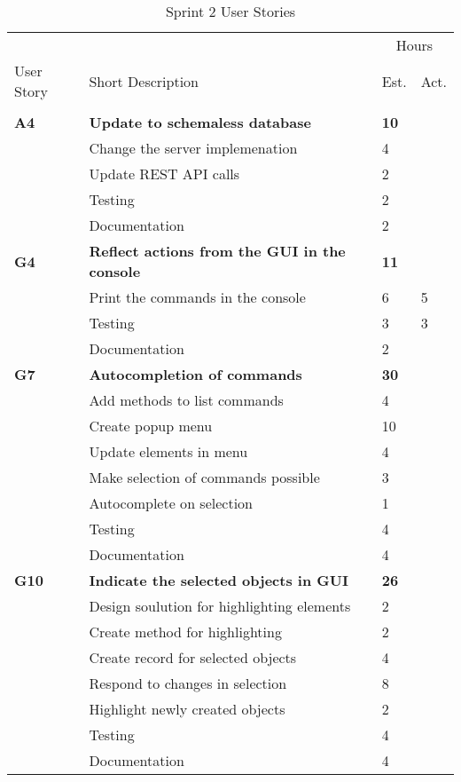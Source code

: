 \begin{table}
\caption{Sprint 2 User Stories}
\centering
\begin{tabular}{ l p{8cm} l l }
\hline 
			&				&\multicolumn{2}{c}{Hours}			\\
 User Story	& Short Description		&Est.		&Act.	                               \\ 
\hline \\ [-2.0ex]
 \bf{A4}     &\bf{Update to schemaless database}		&\bf{10}		&\bf{}          \\ 
		  &Change the server implemenation		&4			&		\\
		  &Update REST API calls					&2			&		\\
		  &Testing							&2			&		\\
		  &Documentation						&2			&		\\

 \bf{G4}     &\bf{Reflect actions from the GUI in the console} 		&\bf{11}		&\bf{}               \\ 
		  &Print the commands in the console				&6			&5		\\
		  &Testing									&3			&3		\\
		  &Documentation								&2			&		\\

 \bf{G7}     &\bf{Autocompletion of commands} 	&\bf{30}		&\bf{}		     \\ 
		  &Add methods to list commands		&4			&		\\
		  &Create popup menu				&10			&		\\
		  &Update elements in menu			&4			&		\\
		  &Make selection of commands possible&3			&		\\
		  &Autocomplete on selection			&1			&		\\
		  &Testing						&4			&		\\
		  &Documentation					&4			&		\\

 \bf{G10}   &\bf{Indicate the selected objects in GUI}		&\bf{26}		&\bf{}		     \\ 
		  &Design soulution for highlighting elements	&2			&		\\
		  &Create method for highlighting				&2			&		\\
		  &Create record for selected objects			&4			&		\\
		  &Respond to changes in selection				&8			&		\\
		  &Highlight newly created objects				&2			&		\\
		  &Testing								&4			&		\\
		  &Documentation							&4			&		\\


\end{tabular}
\end{table}
